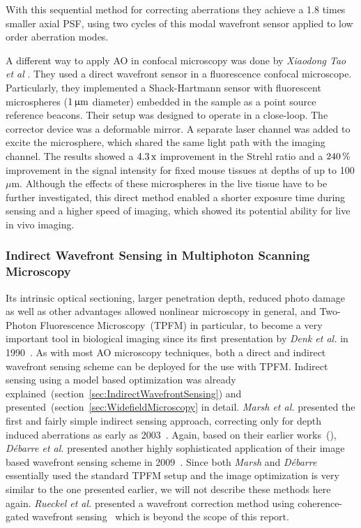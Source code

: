 With this sequential method for correcting aberrations they achieve a 1.8 times smaller axial PSF, using two cycles of this modal wavefront sensor applied to low order aberration modes.

A different way to apply AO in confocal microscopy was done by \textit{Xiaodong Tao et al} \cite{scan_Confocal_direct_sensing}. They used a direct wavefront sensor in a fluorescence confocal microscope. Particularly, they implemented a Shack-Hartmann sensor with fluorescent microspheres ($\unit[1]{\upmu m}$ diameter) embedded in the sample as a point source reference beacons. Their setup was designed to operate in a close-loop. The corrector device was a deformable mirror. A separate laser channel was added to excite the microsphere, which shared the same light path with the imaging channel. The results showed a $\unit[4.3]{\text{x}}$ improvement in the Strehl ratio and a $\unit[240]{\%}$ improvement in the signal intensity for fixed mouse tissues at depths of up to 100 $\mu$m. Although the effects of these microspheres in the live tissue have to be further investigated, this direct method enabled a shorter exposure time during sensing and a higher speed of imaging, which showed its potential ability for live in vivo imaging.


\subsubsection{Indirect Wavefront Sensing in Multiphoton Scanning Microscopy}
\label{sec:MultiphotonScanningMicroscopyUsingIndirektSensing}

Its intrinsic optical sectioning, larger penetration depth, reduced photo damage as well as other advantages allowed nonlinear microscopy in general, and Two-Photon Fluorescence Microscopy~(TPFM) in particular, to become a very important tool in biological imaging since its first presentation by \emph{Denk et al.} in 1990~\cite{scan_TPFM_principle}. As with most AO microscopy techniques, both a direct and indirect wavefront sensing scheme can be deployed for the use with TPFM. Indirect sensing using a model based optimization was already explained~(section~\ref{sec:IndirectWavefrontSensing}) and presented~(section~\ref{sec:WidefieldMicroscopy} in detail. \emph{Marsh et al.} presented the first and fairly simple indirect sensing approach, correcting only for depth induced aberrations as early as 2003~\cite{scan_TPFM_pratical}. Again, based on their earlier works~(\cite{wide_AOM_loew_freq,wide_AOM_structured_illu}), \emph{D\'{e}barre et al.} presented another highly sophisticated application of their image based wavefront sensing scheme in 2009~\cite{scan_TPFM_image_based}. Since both \emph{Marsh} and \emph{D\'{e}barre} essentially used the standard TPFM setup and the image optimization is very similar to the one presented earlier, we will not describe these methods here again. \emph{Rueckel et al.} presented a wavefront correction method using coherence-gated wavefront sensing~\cite{scan_TPFM_gated_wavefront} which is beyond the scope of this report. 

